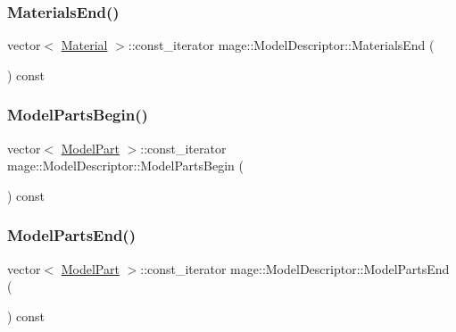 \hypertarget{classmage_1_1_model_descriptor_a3e1880190d58d4d1bc308766f804047d}{}\label{classmage_1_1_model_descriptor_a3e1880190d58d4d1bc308766f804047d} 
\subsubsection{\texorpdfstring{Materials\+End()}{MaterialsEnd()}}
{\footnotesize\ttfamily vector$<$ \hyperlink{structmage_1_1_material}{Material} $>$\+::const\+\_\+iterator mage\+::\+Model\+Descriptor\+::\+Materials\+End (\begin{DoxyParamCaption}{ }\end{DoxyParamCaption}) const}

\hypertarget{classmage_1_1_model_descriptor_a721a81fae1d5613af8a3a037577ce454}{}\label{classmage_1_1_model_descriptor_a721a81fae1d5613af8a3a037577ce454} 
\subsubsection{\texorpdfstring{Model\+Parts\+Begin()}{ModelPartsBegin()}}
{\footnotesize\ttfamily vector$<$ \hyperlink{structmage_1_1_model_part}{Model\+Part} $>$\+::const\+\_\+iterator mage\+::\+Model\+Descriptor\+::\+Model\+Parts\+Begin (\begin{DoxyParamCaption}{ }\end{DoxyParamCaption}) const}

\hypertarget{classmage_1_1_model_descriptor_a97f78d3e5a157020f62f5e6003deaac6}{}\label{classmage_1_1_model_descriptor_a97f78d3e5a157020f62f5e6003deaac6} 
\subsubsection{\texorpdfstring{Model\+Parts\+End()}{ModelPartsEnd()}}
{\footnotesize\ttfamily vector$<$ \hyperlink{structmage_1_1_model_part}{Model\+Part} $>$\+::const\+\_\+iterator mage\+::\+Model\+Descriptor\+::\+Model\+Parts\+End (\begin{DoxyParamCaption}{ }\end{DoxyParamCaption}) const}

